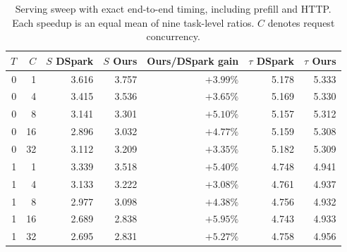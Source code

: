 \begin{table}[ht]
\centering\small
\caption{Serving sweep with exact end-to-end timing, including prefill and HTTP.
Each speedup is an equal mean of nine task-level ratios. $C$ denotes request concurrency.}
\label{tab:serving-sweep}
\setlength{\tabcolsep}{5pt}
\begin{tabular}{rrrrrrr}
\toprule
$T$ & $C$ & $S$ DSpark & $S$ Ours & Ours/DSpark gain & $\tau$ DSpark & $\tau$ Ours \\
\midrule
0 & 1 & 3.616 & 3.757 & $+3.99\%$ & 5.178 & 5.333 \\
0 & 4 & 3.415 & 3.536 & $+3.65\%$ & 5.169 & 5.330 \\
0 & 8 & 3.141 & 3.301 & $+5.10\%$ & 5.157 & 5.312 \\
0 & 16 & 2.896 & 3.032 & $+4.77\%$ & 5.159 & 5.308 \\
0 & 32 & 3.112 & 3.209 & $+3.35\%$ & 5.182 & 5.309 \\
\midrule
1 & 1 & 3.339 & 3.518 & $+5.40\%$ & 4.748 & 4.941 \\
1 & 4 & 3.133 & 3.222 & $+3.08\%$ & 4.761 & 4.937 \\
1 & 8 & 2.977 & 3.098 & $+4.38\%$ & 4.756 & 4.932 \\
1 & 16 & 2.689 & 2.838 & $+5.95\%$ & 4.743 & 4.933 \\
1 & 32 & 2.695 & 2.831 & $+5.27\%$ & 4.758 & 4.956 \\
\bottomrule
\end{tabular}
\end{table}
